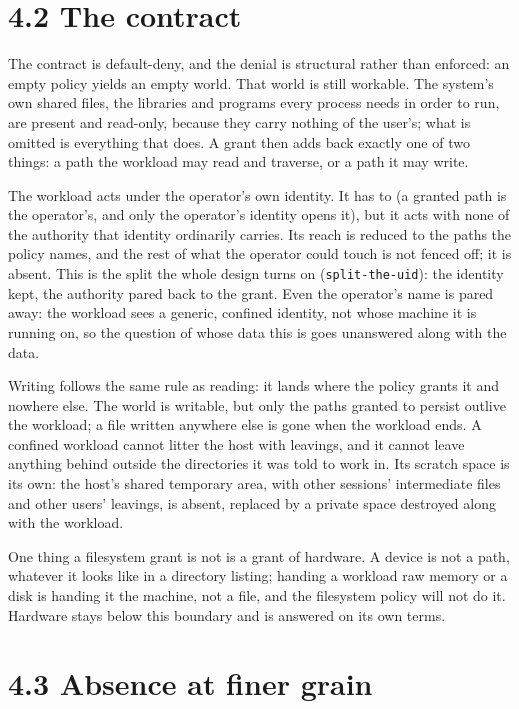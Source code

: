 \hypertarget{the-contract}{%
\section{4.2 The contract}\label{the-contract}}

The contract is default-deny, and the denial is structural rather than
enforced: an empty policy yields an empty world. That world is still
workable. The system's own shared files, the libraries and programs
every process needs in order to run, are present and read-only, because
they carry nothing of the user's; what is omitted is everything that
does. A grant then adds back exactly one of two things: a path the
workload may read and traverse, or a path it may write.

The workload acts under the operator's own identity. It has to (a
granted path is the operator's, and only the operator's identity opens
it), but it acts with none of the authority that identity ordinarily
carries. Its reach is reduced to the paths the policy names, and the
rest of what the operator could touch is not fenced off; it is absent.
This is the split the whole design turns on (\texttt{split-the-uid}):
the identity kept, the authority pared back to the grant. Even the
operator's name is pared away: the workload sees a generic, confined
identity, not whose machine it is running on, so the question of whose
data this is goes unanswered along with the data.

Writing follows the same rule as reading: it lands where the policy
grants it and nowhere else. The world is writable, but only the paths
granted to persist outlive the workload; a file written anywhere else is
gone when the workload ends. A confined workload cannot litter the host
with leavings, and it cannot leave anything behind outside the
directories it was told to work in. Its scratch space is its own: the
host's shared temporary area, with other sessions' intermediate files
and other users' leavings, is absent, replaced by a private space
destroyed along with the workload.

One thing a filesystem grant is not is a grant of hardware. A device is
not a path, whatever it looks like in a directory listing; handing a
workload raw memory or a disk is handing it the machine, not a file, and
the filesystem policy will not do it. Hardware stays below this boundary
and is answered on its own terms.

\hypertarget{absence-at-finer-grain}{%
\section{4.3 Absence at finer grain}\label{absence-at-finer-grain}}

